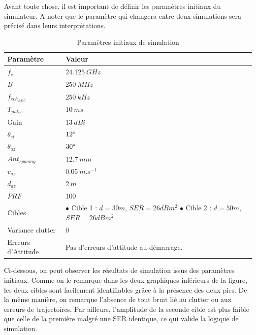 Avant toute chose, il est important de définir les paramètres initiaux du simulateur. A noter que le paramètre qui changera entre deux simulations sera précisé dans leurs interprétations.
\FloatBarrier
\begin{table}[h!]
\centering
\begin{tabularx}{0.6\textwidth}{|l|X|}
\hline
\textbf{Paramètre}          & \textbf{Valeur} \\ \hline
$f_c$                       & $24.125~GHz$      \\ \hline
$B$                         & $250~MHz$         \\ \hline
$f_{ech_{ADC}}$             & $250~kHz$         \\ \hline
$T_{pulse}$                 & $10~ms$           \\ \hline
Gain                        & $13~dBi$          \\ \hline
$\theta_{el}$               & $12\degree$          \\ \hline
$\theta_{az}$               & $30\degree$          \\ \hline
$Ant_{spacing}$             & $12.7~mm$         \\ \hline
$v_{az}$                    & $0.05~m.s^{-1}$        \\ \hline
$d_{az}$                    & $2~m$             \\ \hline
$PRF$                       & $100$             \\ \hline
Cibles                      & $\bullet$ Cible 1 : $d=30 m$, $SER = 26 dBm^2$ \newline $\bullet$ Cible 2 : $d=50 m$, $SER = 26 dBm^2$ \\ \hline
Variance clutter            & $0$               \\ \hline
Erreurs d'Attitude          & Pas d'erreurs d'attitude au démarrage. \\ \hline
\end{tabularx}
\caption{Paramètres initiaux de simulation}
\label{tab:param_simu_init}
\end{table}
\FloatBarrier

Ci-dessous, on peut observer les résultats de simulation issus des paramètres initiaux. Comme on le remarque dans les deux graphiques inférieurs de la figure, les deux cibles sont facilement identifiables grâce à la présence des deux pics. De la même manière, on remarque l'absence de tout bruit lié au clutter ou aux erreurs de trajectoires. Par ailleurs, l'amplitude de la seconde cible est plus faible que celle de la première malgré une SER identique, ce qui valide la logique de simulation. 

